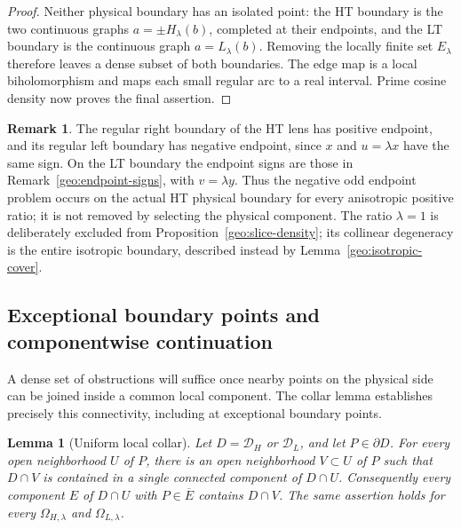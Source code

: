 \documentclass[11pt]{article}
\numberwithin{equation}{section}
\newtheorem{lemma}[theorem]{Lemma}
\theoremstyle{definition}
\newtheorem{remark}[theorem]{Remark}
\renewcommand{\DH}{\mathcal D_H}
\newcommand{\DL}{\mathcal D_L}
\begin{document}
\begin{proof}
Neither physical boundary has an isolated point:
the HT boundary is the two continuous graphs
\(a=\pm H_\lambda(b)\), completed at their endpoints,
and the LT boundary is the continuous graph
\(a=L_\lambda(b)\).
Removing the locally finite set \(E_\lambda\)
therefore leaves a dense subset of both boundaries.
The edge map is a local biholomorphism and maps each
small regular arc to a real interval.  Prime cosine
density now proves the final assertion.
\end{proof}

\begin{remark}\label{geo:slice-signs}
The regular right boundary of the HT lens has positive
endpoint, and its regular left boundary has negative
endpoint, since \(x\) and \(u=\lambda x\) have the
same sign.  On the LT boundary the endpoint signs
are those in Remark~\ref{geo:endpoint-signs}, with
\(v=\lambda y\).  Thus the negative odd endpoint
problem occurs on the actual HT physical boundary
for every anisotropic positive ratio; it is not
removed by selecting the physical component.
The ratio \(\lambda=1\) is deliberately excluded from
Proposition~\ref{geo:slice-density}; its collinear
degeneracy is the entire isotropic boundary, described
instead by Lemma~\ref{geo:isotropic-cover}.
\end{remark}

\subsection{Exceptional boundary points and componentwise continuation}
\label{geo:continuation-section}

A dense set of obstructions will suffice once nearby points on the
physical side can be joined inside a common local component. The
collar lemma establishes precisely this connectivity, including at
exceptional boundary points.

\begin{lemma}[Uniform local collar]\label{geo:collar}
Let \(D=\DH\) or \(\DL\), and let \(P\in\partial D\).
For every open neighborhood \(U\) of \(P\), there is
an open neighborhood \(V\subset U\) of \(P\) such
that \(D\cap V\) is contained in a single connected
component of \(D\cap U\).
Consequently every component \(E\) of \(D\cap U\)
with \(P\in\overline E\) contains \(D\cap V\).
The same assertion holds for every
\(\Omega_{H,\lambda}\) and \(\Omega_{L,\lambda}\).
\end{lemma}
\end{document}
